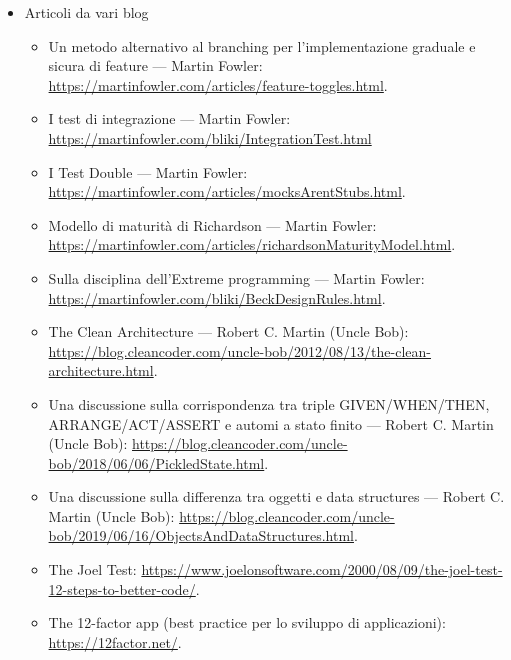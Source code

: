 \documentclass[../norme-di-progetto.tex]{subfiles}
\begin{document}
\begin{itemize}
  \item Articoli da vari blog
        \begin{itemize}
          \item Un metodo alternativo al branching per l'implementazione graduale e sicura di feature --- Martin Fowler: \href{https://martinfowler.com/articles/feature-toggles.html}{https://martinfowler.com/articles/feature-toggles.html}.
          \item I test di integrazione --- Martin Fowler: \href{https://martinfowler.com/bliki/IntegrationTest.html}{https://martinfowler.com/bliki/IntegrationTest.html}
          \item I Test Double --- Martin Fowler: \href{https://martinfowler.com/articles/mocksArentStubs.html}{https://martinfowler.com/articles/mocksArentStubs.html}.
          \item Modello di maturità di Richardson --- Martin Fowler: \href{https://martinfowler.com/articles/richardsonMaturityModel.html}{https://martinfowler.com/articles/richardsonMaturityModel.html}.
          \item Sulla disciplina dell'Extreme programming --- Martin Fowler: \href{https://martinfowler.com/bliki/BeckDesignRules.html}{https://martinfowler.com/bliki/BeckDesignRules.html}.
          \item The Clean Architecture --- Robert C. Martin (Uncle Bob): \href{https://blog.cleancoder.com/uncle-bob/2012/08/13/the-clean-architecture.html}{https://blog.cleancoder.com/uncle-bob/2012/08/13/the-clean-architecture.html}.
          \item Una discussione sulla corrispondenza tra triple GIVEN/WHEN/THEN, ARRANGE/ACT/ASSERT e automi a stato finito --- Robert C. Martin (Uncle Bob): \href{https://blog.cleancoder.com/uncle-bob/2018/06/06/PickledState.html}{https://blog.cleancoder.com/uncle-bob/2018/06/06/PickledState.html}.
          \item Una discussione sulla differenza tra oggetti e data structures --- Robert C. Martin (Uncle Bob): \href{https://blog.cleancoder.com/uncle-bob/2019/06/16/ObjectsAndDataStructures.html}{https://blog.cleancoder.com/uncle-bob/2019/06/16/ObjectsAndDataStructures.html}.
          \item The Joel Test: \href{https://www.joelonsoftware.com/2000/08/09/the-joel-test-12-steps-to-better-code/}{https://www.joelonsoftware.com/2000/08/09/the-joel-test-12-steps-to-better-code/}.
          \item The 12-factor app (best practice per lo sviluppo di applicazioni): \href{https://12factor.net/}{https://12factor.net/}.
        \end{itemize}
\end{itemize}

\end{document}
